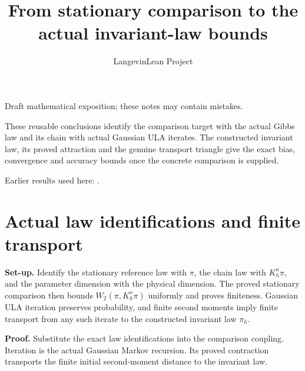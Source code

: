 \documentclass[11pt,a4paper]{article}
\title{\texorpdfstring{From stationary comparison to the actual invariant-law bounds}{From stationary comparison to the actual invariant-law bounds}}
\author{LangevinLean Project}
\date{}
\begin{document}
\maketitle
Draft mathematical exposition; these notes may contain mistakes.


These reusable conclusions identify the comparison target with the actual Gibbs law and its chain with actual Gaussian ULA iterates. The constructed invariant law, its proved attraction and the genuine transport triangle give the exact bias, convergence and accuracy bounds once the concrete comparison is supplied.



Earlier results used here: \cite[Section~3.26]{LangevinLean2026ULASC}.

\section{\texorpdfstring{Actual law identifications and finite transport}{Actual law identifications and finite transport}}


\textbf{Set-up.} Identify the stationary reference law with \(\pi\), the chain law with \(K_h^n\pi\), and the parameter dimension with the physical dimension. The proved stationary comparison then bounds \(W_2(\pi,K_h^n\pi)\) uniformly and proves finiteness. Gaussian ULA iteration preserves probability, and finite second moments imply finite transport from any such iterate to the constructed invariant law \(\pi_h\).



\textbf{Proof.} Substitute the exact law identifications into the comparison coupling. Iteration is the actual Gaussian Markov recursion. Its proved contraction transports the finite initial second-moment distance to the invariant law.
\end{document}
